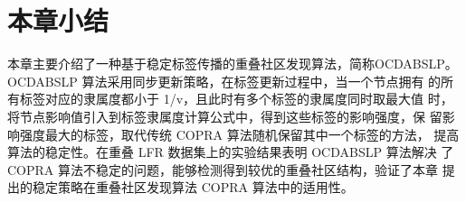 
\section{本章小结}
本章主要介绍了一种基于稳定标签传播的重叠社区发现算法，简称OCDABSLP。OCDABSLP 算法采用同步更新策略，在标签更新过程中，当一个节点拥有
的所有标签对应的隶属度都小于 1/v，且此时有多个标签的隶属度同时取最大值
时，将节点影响值引入到标签隶属度计算公式中，得到这些标签的影响强度，保
留影响强度最大的标签，取代传统 COPRA 算法随机保留其中一个标签的方法，
提高算法的稳定性。在重叠 LFR 数据集上的实验结果表明 OCDABSLP 算法解决
了 COPRA 算法不稳定的问题，能够检测得到较优的重叠社区结构，验证了本章
提出的稳定策略在重叠社区发现算法 COPRA 算法中的适用性。